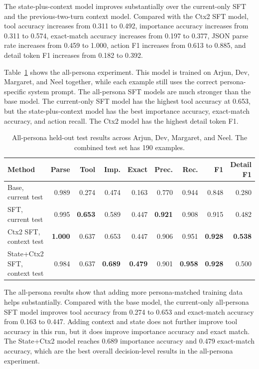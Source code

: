 \documentclass[11pt,a4paper]{article}
\begin{document}
The state-plus-context model improves substantially over the current-only SFT and the previous-two-turn context model. Compared with the Ctx2 SFT model, tool accuracy increases from 0.311 to 0.492, importance accuracy increases from 0.311 to 0.574, exact-match accuracy increases from 0.197 to 0.377, JSON parse rate increases from 0.459 to 1.000, action F1 increases from 0.613 to 0.885, and detail token F1 increases from 0.182 to 0.392.

Table~\ref{tab:all-results} shows the all-persona experiment. This model is trained on Arjun, Dev, Margaret, and Neel together, while each example still uses the correct persona-specific system prompt. The all-persona SFT models are much stronger than the base model. The current-only SFT model has the highest tool accuracy at 0.653, but the state-plus-context model has the best importance accuracy, exact-match accuracy, and action recall. The Ctx2 model has the highest detail token F1.

\begin{table}[t!]
\centering
\small
\begin{tabular}{lrrrrrrrr}
\toprule
Method & Parse & Tool & Imp. & Exact & Prec. & Rec. & F1 & Detail F1 \\
\midrule
Base, current test & 0.989 & 0.274 & 0.474 & 0.163 & 0.770 & 0.944 & 0.848 & 0.280 \\
SFT, current test & 0.995 & \textbf{0.653} & 0.589 & 0.447 & \textbf{0.921} & 0.908 & 0.915 & 0.482 \\
Ctx2 SFT, context test & \textbf{1.000} & 0.637 & 0.653 & 0.447 & 0.906 & 0.951 & \textbf{0.928} & \textbf{0.538} \\
State+Ctx2 SFT, context test & 0.984 & 0.637 & \textbf{0.689} & \textbf{0.479} & 0.901 & \textbf{0.958} & \textbf{0.928} & 0.500 \\
\bottomrule
\end{tabular}
\caption{All-persona held-out test results across Arjun, Dev, Margaret, and Neel. The combined test set has 190 examples.}
\label{tab:all-results}
\end{table}

The all-persona results show that adding more persona-matched training data helps substantially. Compared with the base model, the current-only all-persona SFT model improves tool accuracy from 0.274 to 0.653 and exact-match accuracy from 0.163 to 0.447. Adding context and state does not further improve tool accuracy in this run, but it does improve importance accuracy and exact match. The State+Ctx2 model reaches 0.689 importance accuracy and 0.479 exact-match accuracy, which are the best overall decision-level results in the all-persona experiment.
\end{document}
